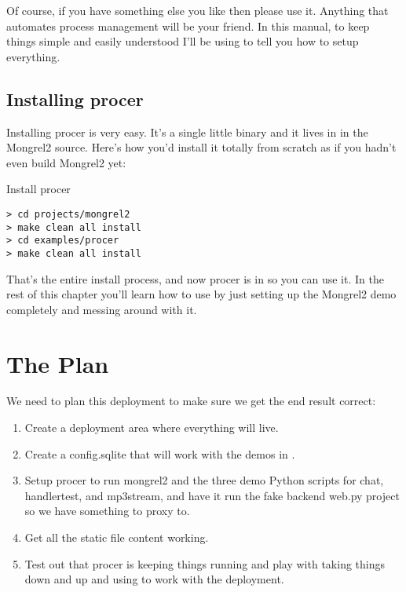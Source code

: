 Of course, if you have something else you like then please use it.  Anything that automates
process management will be your friend.  In this manual, to keep things simple and easily
understood I'll be using  to tell you how to setup everything.

\subsection{Installing procer}

Installing procer is very easy.  It's a single little binary and it lives in 
 in the Mongrel2 source.  Here's how you'd install it
totally from scratch as if you hadn't even build Mongrel2 yet:

\begin{code}{Install procer}
\begin{Verbatim}
> cd projects/mongrel2
> make clean all install
> cd examples/procer
> make clean all install
\end{Verbatim}
\end{code}

That's the entire install process, and now procer is in 
so you can use it.  In the rest of this chapter you'll learn how to use 
by just setting up the Mongrel2 demo completely and messing around with it.


\section{The Plan}

We need to plan this deployment to make sure we get the end result correct:

\begin{enumerate}
\item Create a deployment area where everything will live.
\item Create a config.sqlite that will work with the demos in .
\item Setup procer to run mongrel2 and the three demo Python scripts for chat, handlertest, and mp3stream,
    and have it run the fake backend web.py project so we have something to proxy to.
\item Get all the static file content working.
\item Test out that procer is keeping things running and play with taking things down and up and using
     to work with the deployment.
\end{enumerate}

